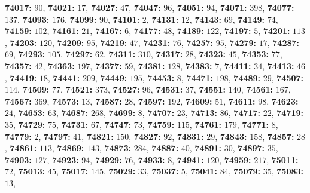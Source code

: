 \textsf{\bfseries 74017:} $90$, \textsf{\bfseries 74021:} $17$, \textsf{\bfseries 74027:} $47$, \textsf{\bfseries 74047:} $96$, \textsf{\bfseries 74051:} $94$, \textsf{\bfseries 74071:} $398$, \textsf{\bfseries 74077:} $137$, \textsf{\bfseries 74093:} $176$, \textsf{\bfseries 74099:} $90$, \textsf{\bfseries 74101:} $2$, \textsf{\bfseries 74131:} $12$, \textsf{\bfseries 74143:} $69$, \textsf{\bfseries 74149:} $74$, \textsf{\bfseries 74159:} $102$, \textsf{\bfseries 74161:} $21$, \textsf{\bfseries 74167:} $6$, \textsf{\bfseries 74177:} $48$, \textsf{\bfseries 74189:} $122$, \textsf{\bfseries 74197:} $5$, \textsf{\bfseries 74201:} $113$, \textsf{\bfseries 74203:} $120$, \textsf{\bfseries 74209:} $95$, \textsf{\bfseries 74219:} $47$, \textsf{\bfseries 74231:} $76$, \textsf{\bfseries 74257:} $95$, \textsf{\bfseries 74279:} $17$, \textsf{\bfseries 74287:} $69$, \textsf{\bfseries 74293:} $105$, \textsf{\bfseries 74297:} $62$, \textsf{\bfseries 74311:} $310$, \textsf{\bfseries 74317:} $28$, \textsf{\bfseries 74323:} $45$, \textsf{\bfseries 74353:} $77$, \textsf{\bfseries 74357:} $42$, \textsf{\bfseries 74363:} $197$, \textsf{\bfseries 74377:} $59$, \textsf{\bfseries 74381:} $128$, \textsf{\bfseries 74383:} $7$, \textsf{\bfseries 74411:} $34$, \textsf{\bfseries 74413:} $46$, \textsf{\bfseries 74419:} $18$, \textsf{\bfseries 74441:} $209$, \textsf{\bfseries 74449:} $195$, \textsf{\bfseries 74453:} $8$, \textsf{\bfseries 74471:} $198$, \textsf{\bfseries 74489:} $29$, \textsf{\bfseries 74507:} $114$, \textsf{\bfseries 74509:} $77$, \textsf{\bfseries 74521:} $373$, \textsf{\bfseries 74527:} $96$, \textsf{\bfseries 74531:} $37$, \textsf{\bfseries 74551:} $140$, \textsf{\bfseries 74561:} $167$, \textsf{\bfseries 74567:} $369$, \textsf{\bfseries 74573:} $13$, \textsf{\bfseries 74587:} $28$, \textsf{\bfseries 74597:} $192$, \textsf{\bfseries 74609:} $51$, \textsf{\bfseries 74611:} $98$, \textsf{\bfseries 74623:} $24$, \textsf{\bfseries 74653:} $63$, \textsf{\bfseries 74687:} $268$, \textsf{\bfseries 74699:} $8$, \textsf{\bfseries 74707:} $23$, \textsf{\bfseries 74713:} $86$, \textsf{\bfseries 74717:} $22$, \textsf{\bfseries 74719:} $35$, \textsf{\bfseries 74729:} $75$, \textsf{\bfseries 74731:} $67$, \textsf{\bfseries 74747:} $73$, \textsf{\bfseries 74759:} $115$, \textsf{\bfseries 74761:} $179$, \textsf{\bfseries 74771:} $8$, \textsf{\bfseries 74779:} $2$, \textsf{\bfseries 74797:} $41$, \textsf{\bfseries 74821:} $150$, \textsf{\bfseries 74827:} $92$, \textsf{\bfseries 74831:} $29$, \textsf{\bfseries 74843:} $158$, \textsf{\bfseries 74857:} $28$, \textsf{\bfseries 74861:} $113$, \textsf{\bfseries 74869:} $143$, \textsf{\bfseries 74873:} $284$, \textsf{\bfseries 74887:} $40$, \textsf{\bfseries 74891:} $30$, \textsf{\bfseries 74897:} $35$, \textsf{\bfseries 74903:} $127$, \textsf{\bfseries 74923:} $94$, \textsf{\bfseries 74929:} $76$, \textsf{\bfseries 74933:} $8$, \textsf{\bfseries 74941:} $120$, \textsf{\bfseries 74959:} $217$, \textsf{\bfseries 75011:} $72$, \textsf{\bfseries 75013:} $45$, \textsf{\bfseries 75017:} $145$, \textsf{\bfseries 75029:} $33$, \textsf{\bfseries 75037:} $5$, \textsf{\bfseries 75041:} $84$, \textsf{\bfseries 75079:} $35$, \textsf{\bfseries 75083:} $13$, 
